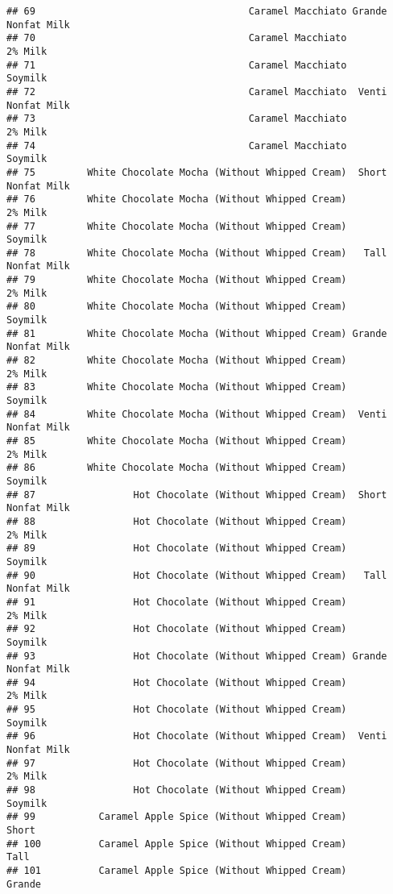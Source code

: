 \documentclass[
]{article}
\begin{document}
\begin{verbatim}
## 69                                     Caramel Macchiato Grande Nonfat Milk
## 70                                     Caramel Macchiato            2% Milk
## 71                                     Caramel Macchiato            Soymilk
## 72                                     Caramel Macchiato  Venti Nonfat Milk
## 73                                     Caramel Macchiato            2% Milk
## 74                                     Caramel Macchiato            Soymilk
## 75         White Chocolate Mocha (Without Whipped Cream)  Short Nonfat Milk
## 76         White Chocolate Mocha (Without Whipped Cream)            2% Milk
## 77         White Chocolate Mocha (Without Whipped Cream)            Soymilk
## 78         White Chocolate Mocha (Without Whipped Cream)   Tall Nonfat Milk
## 79         White Chocolate Mocha (Without Whipped Cream)            2% Milk
## 80         White Chocolate Mocha (Without Whipped Cream)            Soymilk
## 81         White Chocolate Mocha (Without Whipped Cream) Grande Nonfat Milk
## 82         White Chocolate Mocha (Without Whipped Cream)            2% Milk
## 83         White Chocolate Mocha (Without Whipped Cream)            Soymilk
## 84         White Chocolate Mocha (Without Whipped Cream)  Venti Nonfat Milk
## 85         White Chocolate Mocha (Without Whipped Cream)            2% Milk
## 86         White Chocolate Mocha (Without Whipped Cream)            Soymilk
## 87                 Hot Chocolate (Without Whipped Cream)  Short Nonfat Milk
## 88                 Hot Chocolate (Without Whipped Cream)            2% Milk
## 89                 Hot Chocolate (Without Whipped Cream)            Soymilk
## 90                 Hot Chocolate (Without Whipped Cream)   Tall Nonfat Milk
## 91                 Hot Chocolate (Without Whipped Cream)            2% Milk
## 92                 Hot Chocolate (Without Whipped Cream)            Soymilk
## 93                 Hot Chocolate (Without Whipped Cream) Grande Nonfat Milk
## 94                 Hot Chocolate (Without Whipped Cream)            2% Milk
## 95                 Hot Chocolate (Without Whipped Cream)            Soymilk
## 96                 Hot Chocolate (Without Whipped Cream)  Venti Nonfat Milk
## 97                 Hot Chocolate (Without Whipped Cream)            2% Milk
## 98                 Hot Chocolate (Without Whipped Cream)            Soymilk
## 99           Caramel Apple Spice (Without Whipped Cream)              Short
## 100          Caramel Apple Spice (Without Whipped Cream)               Tall
## 101          Caramel Apple Spice (Without Whipped Cream)             Grande

\end{verbatim}
\end{document}
